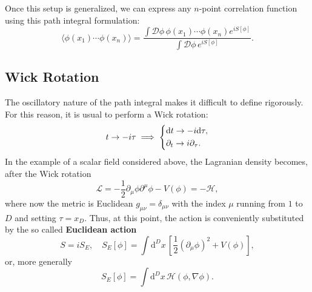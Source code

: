Once this setup is generalized, we can express any \(n\)-point correlation function using this path integral formulation:
\begin{equation}
    \langle\phi(x_{1})\cdots\phi(x_{n})\rangle=\frac{\int\mathcal{D}\phi \, \phi(x_{1})\cdots\phi(x_{n})e^{iS[\phi]}}{\int\mathcal{D}\phi \, e^{iS[\phi]}}.
    \label{eq:correlation_functions_qft}
\end{equation}

\subsection{Wick Rotation}

The oscillatory nature of the path integral makes it difficult to define rigorously. For this reason, it is usual to perform a Wick rotation:
\begin{equation}
    t \to -i\tau \implies \begin{dcases}
        \mathrm{d} t \to -i\mathrm{d}\tau, \\
        \partial_{t} \to i\partial_{\tau}.
    \end{dcases}
    \label{eq:wick_rotation}
\end{equation}
In the example of a scalar field considered above, the Lagranian density becomes, after the Wick rotation
\[
    \mathcal{L} = -\frac{1}{2} \partial_{\mu}\phi\partial^{\mu}\phi - V(\phi) = - \mathcal{H},
\]
where now the metric is Euclidean \(g_{\mu\nu} = \delta_{\mu\nu}\) with the index \(\mu\) running from \(1\) to \(D\) and setting \(\tau=x_{D}\).
Thus, at this point, the action is conveniently substituted by the so called \textbf{Euclidean action}
\[
    S = i S_E, \quad S_E[\phi] = \int \mathrm{d}^D x \, \left[ \frac{1}{2} (\partial_\mu\phi)^2 + V(\phi) \right],
\]
or, more generally
\begin{equation}
    S_E[\phi] = \int \mathrm{d}^D x \, \mathcal{H}(\phi, \nabla\phi).
    \label{eq:euclidean_action}
\end{equation}

